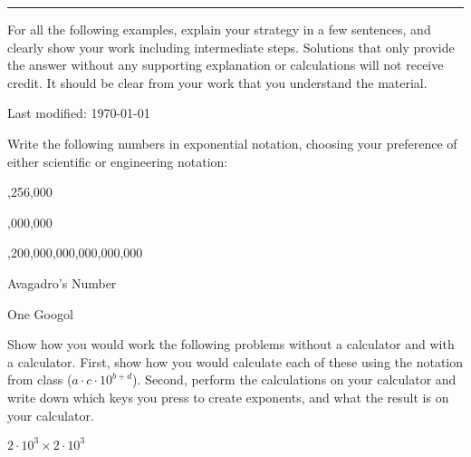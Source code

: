 \documentclass{article}
\begin{document}
\hrule
\vspace{10pt}

For all the following examples, explain your strategy in a few
sentences, and clearly show your work including intermediate steps.
Solutions that only provide the answer without any supporting
explanation or calculations will not receive credit.  It should be
clear from your work that you understand the material.

{\tiny Last modified: \today}

Write the following numbers in exponential notation, choosing your
preference of either scientific or engineering notation:

 

,256,000 


 

,000,000 


,200,000,000,000,000,000 


\subproblem Avagadro's Number 

\subproblem One Googol 



Show how you would work the following problems without a calculator and
with a calculator.  First, show how you would calculate each of these
using the notation from class ($a \cdot c \cdot 10^{b+d}$).  Second,
perform the calculations on your calculator and write down which keys
you press to create exponents, and what the result is on your
calculator.

\subproblem $2 \cdot 10^3 \times 2 \cdot 10^3$
\end{document}
